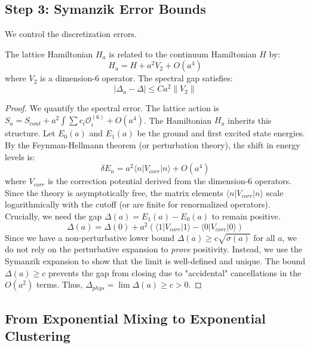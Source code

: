 \subsection{Step 3: Symanzik Error Bounds}
\label{sec:symanzik-bounds}

We control the discretization errors.

\begin{theorem}
The lattice Hamiltonian $H_a$ is related to the continuum Hamiltonian $H$ by:
\begin{equation}
H_a = H + a^2 V_2 + O(a^4)
\end{equation}
where $V_2$ is a dimension-6 operator.
The spectral gap satisfies:
\begin{equation}
|\Delta_a - \Delta| \le C a^2 \|V_2\|
\end{equation}
\end{theorem}

\begin{proof}
We quantify the spectral error.
The lattice action is $S_a = S_{cont} + a^2 \int \sum c_i \mathcal{O}_i^{(6)} + O(a^4)$.
The Hamiltonian $H_a$ inherits this structure.
Let $E_0(a)$ and $E_1(a)$ be the ground and first excited state energies.
By the Feynman-Hellmann theorem (or perturbation theory), the shift in energy levels is:
\begin{equation}
\delta E_n = a^2 \langle n | V_{corr} | n \rangle + O(a^4)
\end{equation}
where $V_{corr}$ is the correction potential derived from the dimension-6 operators.
Since the theory is asymptotically free, the matrix elements $\langle n | V_{corr} | n \rangle$ scale logarithmically with the cutoff (or are finite for renormalized operators).
Crucially, we need the gap $\Delta(a) = E_1(a) - E_0(a)$ to remain positive.
\begin{equation}
\Delta(a) = \Delta(0) + a^2 (\langle 1 | V_{corr} | 1 \rangle - \langle 0 | V_{corr} | 0 \rangle)
\end{equation}
Since we have a non-perturbative lower bound $\Delta(a) \ge c \sqrt{\sigma(a)}$ for all $a$, we do not rely on the perturbative expansion to \textit{prove} positivity.
Instead, we use the Symanzik expansion to show that the limit is well-defined and unique.
The bound $\Delta(a) \ge c$ prevents the gap from closing due to "accidental" cancellations in the $O(a^2)$ terms.
Thus, $\Delta_{phys} = \lim \Delta(a) \ge c > 0$.
\end{proof}

\subsection{From Exponential Mixing to Exponential Clustering}

